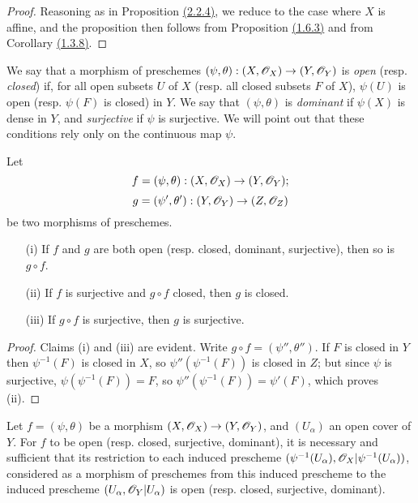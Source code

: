 \begin{proof}
\label{proof-prop-1.2.2.5}
Reasoning as in Proposition \hyperref[prop-1.2.2.4]{(2.2.4)}, we reduce to the case where $X$ is
affine, and the proposition then follows from Proposition \hyperref[prop-1.1.6.3]{(1.6.3)}
and from Corollary \hyperref[cor-1.1.3.8]{(1.3.8)}.
\end{proof}

\begin{env}[2.2.6]
\label{env-1.2.2.6}
We say that a morphism of preschemes
$(\psi,\theta):(X,\mathscr{O}_X)\to(Y,\mathscr{O}_Y)$ is {\it open} (resp. {\it closed})
if, for all open subsets $U$ of $X$ (resp. all closed subsets $F$ of $X$),
$\psi(U)$ is open (resp. $\psi(F)$ is closed) in $Y$. We say that
$(\psi,\theta)$ is {\it dominant} if $\psi(X)$ is dense in $Y$, and
{\it surjective} if $\psi$ is surjective. We will point out that these
conditions rely only on the continuous map $\psi$.
\end{env}

\begin{prop}[2.2.7]
\label{prop-1.2.2.7}
Let
\[
  f=(\psi,\theta):(X,\mathscr{O}_X)\to(Y,\mathscr{O}_Y);
\]
\[
  g=(\psi',\theta'):(Y,\mathscr{O}_Y)\to(Z,\mathscr{O}_Z)
\]
be two morphisms of preschemes.
\begin{itemize}
  \item[{\rm(i)}] If $f$ and $g$ are both open (resp. closed, dominant, surjective),
        then so is $g\circ f$.
  \item[{\rm(ii)}] If $f$ is surjective and $g\circ f$ closed, then $g$ is closed.
  \item[{\rm(iii)}] If $g\circ f$ is surjective, then $g$ is surjective.
\end{itemize}
\end{prop}

\begin{proof}
\label{proof-prop-1.2.2.7}
Claims (i) and (iii) are evident. Write $g\circ f=(\psi'',\theta'')$.
If $F$ is closed in $Y$ then $\psi^{-1}(F)$ is closed in $X$, so
$\psi''(\psi^{-1}(F))$ is closed in $Z$; but since $\psi$ is surjective,
$\psi(\psi^{-1}(F))=F$, so $\psi''(\psi^{-1}(F))=\psi'(F)$, which proves (ii).
\end{proof}

\begin{prop}[2.2.8]
\label{prop-1.2.2.8}
Let $f=(\psi,\theta)$ be a morphism
$(X,\mathscr{O}_X)\to(Y,\mathscr{O}_Y)$, and $(U_\alpha)$ an open cover of $Y$. For $f$ to be
open (resp. closed, surjective, dominant), it is necessary and sufficient that
its restriction to each induced prescheme
$(\psi^{-1}(U_\alpha),\mathscr{O}_X|\psi^{-1}(U_\alpha))$, considered as a morphism of
preschemes from this induced prescheme to the induced prescheme
$(U_\alpha,\mathscr{O}_Y|U_\alpha)$ is open (resp. closed, surjective, dominant).
\end{prop}

